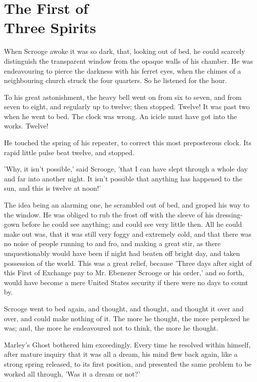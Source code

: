 \chapter{The First of\\Three Spirits}

When Scrooge awoke it was so dark, that, looking out of bed, he could
scarcely distinguish the transparent window from the opaque walls of his
chamber. He was endeavouring to pierce the darkness with his ferret
eyes, when the chimes of a neighbouring church struck the four quarters.
So he listened for the hour.

To his great astonishment, the heavy bell went on from six to seven, and
from seven to eight, and regularly up to twelve; then stopped. Twelve!
It was past two when he went to bed. The clock was wrong. An icicle must
have got into the works. Twelve!

He touched the spring of his repeater, to correct this most preposterous
clock. Its rapid little pulse beat twelve, and stopped.

'Why, it isn't possible,' said Scrooge, 'that I can have slept through a
whole day and far into another night. It isn't possible that anything
has happened to the sun, and this is twelve at noon!'

The idea being an alarming one, he scrambled out of bed, and groped his
way to the window. He was obliged to rub the frost off with the sleeve
of his dressing-gown before he could see anything; and could see very
little then. All he could make out was, that it was still very foggy and
extremely cold, and that there was no noise of people running to and
fro, and making a great stir, as there unquestionably would have been if
night had beaten off bright day, and taken possession of the world. This
was a great relief, because 'Three days after sight of this First of
Exchange pay to Mr. Ebenezer Scrooge or his order,' and so forth, would
have become a mere United States security if there were no days to count
by.

Scrooge went to bed again, and thought, and thought, and thought it over
and over, and could make nothing of it. The more he thought, the more
perplexed he was; and, the more he endeavoured not to think, the more he
thought.

Marley's Ghost bothered him exceedingly. Every time he resolved within
himself, after mature inquiry that it was all a dream, his mind flew
back again, like a strong spring released, to its first position, and
presented the same problem to be worked all through, 'Was it a dream or
not?'

